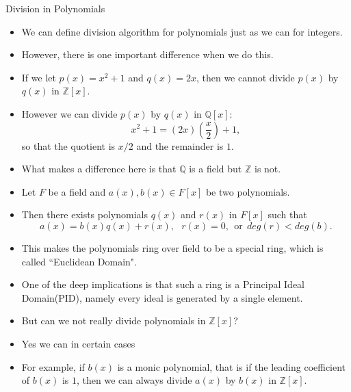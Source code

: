 \documentclass[ %
 10pt, xcolor={dvipsnames,svgnames,x11names,hyperref},
   hyperref={colorlinks=true,citecolor=green,linkcolor=DarkRed,urlcolor=ProcessBlue,anchorcolor=blue}
  ]{beamer}
\newenvironment{stepitemize}{\begin{itemize}[<+->]}{\end{itemize} }
\newcommand{\Z}{\mathbb{Z}}
\newcommand{\Q}{\mathbb{Q}}
\begin{document}
\begin{frame}{Division in Polynomials}
\begin{stepitemize}
\item We can define division algorithm for polynomials just as we can for integers.
\item However, there is one important difference when we do this. 
\item 
If we let $p(x)=x^2+1$ and $q(x)=2x$, then we cannot divide $p(x)$ by $q(x)$ in $\Z[x]$. 
\item However we can divide $p(x)$ by $q(x)$ in $\Q[x]$:
$$x^2+1 = (2x)(\frac{x}{2})+1,$$ so that the quotient is $x/2$ and the remainder is $1$. 
\item What makes a difference here is that $\Q$ is a field but $\Z$ is not.
\end{stepitemize}
\end{frame}

\begin{frame}{}
\begin{stepitemize}
\item Let $F$ be a field and $a(x), b(x) \in F[x]$ be two polynomials. 
\item Then there exists polynomials $q(x)$ and $r(x)$ in $F[x]$ such that 
$$a(x) = b(x)q(x)+r(x), \:\:\: r(x)=0, \:\:\textrm{or}\:\: deg(r)<deg(b).$$
\item This makes the polynomials ring over field to be a special ring, which is called ``Euclidean Domain". 
\item One of the deep implications is that such a ring is a Principal Ideal Domain(PID), namely every ideal is generated by a single element. 
\item But can we not really divide polynomials in $\Z[x]$?
\item Yes we can in certain cases
\item For example, if $b(x)$ is a monic polynomial, that is if the leading coefficient of $b(x)$ is $1$, then we can always divide $a(x)$ by $b(x)$ in $\Z[x]$. 
\end{stepitemize}    
\end{frame}
\end{document}
